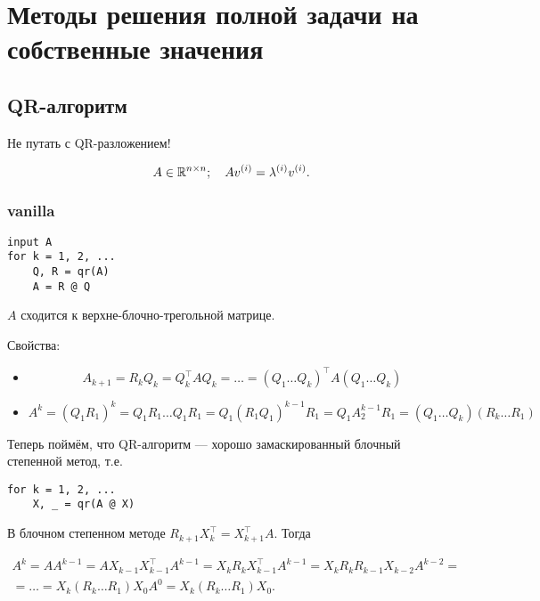 \section{Методы решения полной задачи на собственные значения}

\subsection{QR-алгоритм}

Не путать с QR-разложением!

\[
    A \in \mathbb{R}^{n \times n}; \quad A v^{(i)} = \lambda^{(i)} v^{(i)}.
\]

\subsubsection{vanilla}

\begin{verbatim}
input A
for k = 1, 2, ...
    Q, R = qr(A)
    A = R @ Q
\end{verbatim}

$A$ сходится к верхне-блочно-трегольной матрице.

Свойства:

\begin{itemize}
    \item
        \[
            A_{k + 1} = R_k Q_k = Q_k^\top A Q_k = \dots =
            (Q_1 \dots Q_k)^\top A (Q_1 \dots Q_k)
        \]
    \item
        \[
            A^k = (Q_1 R_1)^k = Q_1 R_1 \dots Q_1 R_1
            = Q_1 (R_1 Q_1)^{k - 1} R_1 = Q_1 A_2^{k - 1} R_1
            = (Q_1 \dots Q_k) (R_k \dots R_1)
        \]
\end{itemize}

Теперь поймём, что QR-алгоритм --- хорошо замаскированный блочный степенной
метод, т.е.

\begin{verbatim}
for k = 1, 2, ...
    X, _ = qr(A @ X)
\end{verbatim}

В блочном степенном методе $R_{k + 1} X_k^\top = X_{k + 1}^\top A$. Тогда

\begin{multline*}
    A^k = A A^{k - 1} = A X_{k - 1} X_{k - 1}^\top A^{k - 1}
    = X_k R_k X_{k - 1}^\top A^{k - 1}
    = X_k R_k R_{k - 1} X_{k - 2} A^{k - 2} =\\= \ldots
    = X_k (R_k \dots R_1) X_0 A^0 = X_k (R_k \dots R_1) X_0.
\end{multline*}

